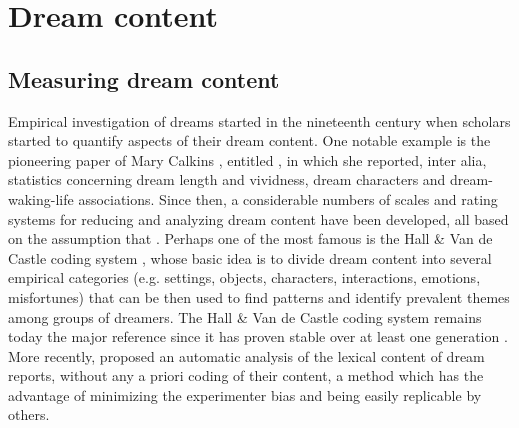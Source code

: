 \cleardoublepage

\chapter{Dream content}
\label{sec:dream-content}


\section{Measuring dream content}
\label{sec:dream-content:method}

Empirical investigation of dreams started in the nineteenth century when scholars started to quantify aspects of their dream content. One notable example is the pioneering paper of Mary Calkins \citeyearpar{calkins_statistics_1893}, entitled , in which she reported, inter alia, statistics concerning dream length and vividness, dream characters and dream-waking-life associations. Since then, a considerable numbers of scales and rating systems for reducing and analyzing dream content have been developed, all based on the assumption that  \citep{schredl_dream_2010}. Perhaps one of the most famous is the Hall \& Van de Castle coding system \citeyearpar{hall_content_1966}, whose basic idea is to divide dream content into several empirical categories (e.g. settings, objects, characters, interactions, emotions, misfortunes) that can be then used to find patterns and identify prevalent themes among groups of dreamers. The Hall \& Van de Castle coding system remains today the major reference since it has proven stable over at least one generation \citep{hall_dreams_1982}. More recently, \citet{schwartz_exploration_1999} proposed an automatic analysis of the lexical content of dream reports, without any a priori coding of their content, a method which has the advantage of minimizing the experimenter bias and being easily replicable by others.

